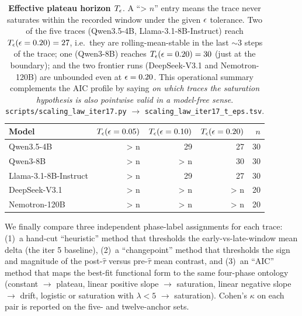 \begin{table}[t]
  \centering
  \small
  \begin{tabular}{lrrrr}
    \toprule
    Model & $T_{\epsilon}(\epsilon = 0.05)$ & $T_{\epsilon}(\epsilon = 0.10)$ &
           $T_{\epsilon}(\epsilon = 0.20)$ & $n$ \\
    \midrule
    Qwen3.5-4B            & \textgreater{} n & 29 & 27 & 30 \\
    Qwen3-8B              & \textgreater{} n & \textgreater{} n & 30 & 30 \\
    Llama-3.1-8B-Instruct & \textgreater{} n & 29 & 27 & 30 \\
    DeepSeek-V3.1         & \textgreater{} n & \textgreater{} n & \textgreater{} n & 20 \\
    Nemotron-120B         & \textgreater{} n & \textgreater{} n & \textgreater{} n & 20 \\
    \bottomrule
  \end{tabular}
  \caption{\textbf{Effective plateau horizon $T_{\epsilon}$}.  A
    ``\textgreater{} $n$'' entry means the trace never saturates
    within the recorded window under the given $\epsilon$ tolerance.
    Two of the five traces (Qwen3.5-4B, Llama-3.1-8B-Instruct)
    reach $T_{\epsilon}(\epsilon = 0.20) = 27$, i.e.\ they are
    rolling-mean-stable in the last $\sim$3 steps of the trace;
    one (Qwen3-8B) reaches $T_{\epsilon}(\epsilon = 0.20) = 30$ (just at
    the boundary); and the two frontier runs (DeepSeek-V3.1 and
    Nemotron-120B) are unbounded even at $\epsilon = 0.20$.  This
    operational summary complements the AIC profile by saying
    \emph{on which traces the saturation hypothesis is also
    pointwise valid in a model-free sense}.
    \texttt{scripts/scaling\_law\_iter17.py} $\to$
    \texttt{scaling\_law\_iter17\_t\_eps.tsv}.}
  \label{tab:scaling-iter17-teps}
\end{table}

We finally compare three independent phase-label assignments for
each trace: (1)~a hand-cut ``heuristic'' method that thresholds
the early-vs-late-window mean delta (the iter 5 baseline),
(2)~a ``changepoint'' method that thresholds the sign and
magnitude of the post-$\hat\tau$ versus pre-$\hat\tau$ mean
contrast, and (3)~an ``AIC'' method that maps the best-fit
functional form to the same four-phase ontology (constant $\to$
plateau, linear positive slope $\to$ saturation, linear
negative slope $\to$ drift, logistic or saturation with
$\lambda < 5$ $\to$ saturation).  Cohen's $\kappa$ on each
pair is reported on the five- and twelve-anchor sets.

